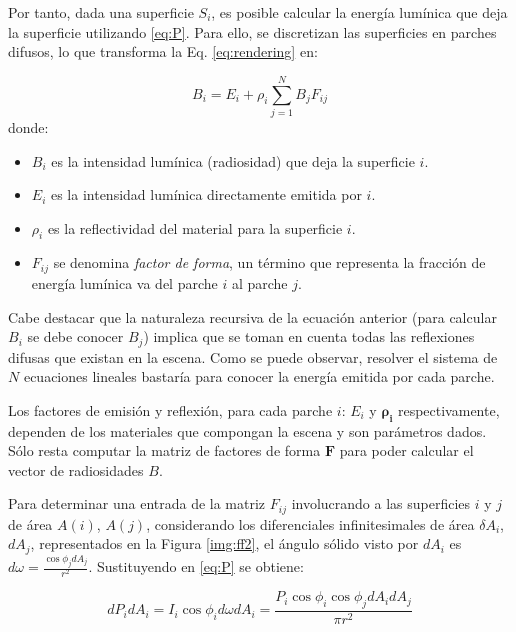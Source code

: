 Por tanto, dada una superficie $S_{i}$, es posible calcular la energía lumínica que deja la superficie utilizando \eqref{eq:P}. Para ello, se discretizan las superficies en parches difusos, lo que transforma la Eq. \eqref{eq:rendering} en:

\begin{equation}
    B_{i} = E_{i} + \rho_{i} \sum_{j=1}^{N} B_{j} F_{ij} \label{eq:radiosity}
\end{equation}
donde:
\begin{itemize}
    \item $B_{i}$ es la intensidad lumínica (radiosidad) que deja la superficie $i$.
    \item $E_{i}$ es la intensidad lumínica directamente emitida por $i$.
    \item $\rho_{i}$ es la reflectividad del material para la superficie $i$.
    \item $F_{ij}$ se denomina \textit{factor de forma}, un término que representa la fracción de energía lumínica va del parche $i$ al parche $j$. 
\end{itemize}

Cabe destacar que la naturaleza recursiva de la ecuación anterior (para calcular $B_{i}$ se debe conocer $B_{j}$) implica que se toman en cuenta todas las reflexiones difusas que existan en la escena. Como se puede observar, resolver el sistema de $N$ ecuaciones lineales bastaría para conocer la energía emitida por cada parche. 

Los factores de emisión y reflexión, para cada parche $i$: $E_{i}$ y $\mathbf{\rho_{i}}$ respectivamente, dependen de los materiales que compongan la escena y son parámetros dados. Sólo resta computar la matriz de factores de forma $\mathbf{F}$ para poder calcular el vector de radiosidades $B$. 

Para determinar una entrada de la matriz $F_{ij}$ involucrando a las superficies $i$ y $j$ de área $A(i)$, $A(j)$, considerando los diferenciales infinitesimales de área $\delta{A_{i}}$, $d{A_{j}}$, representados en la Figura \ref{img:ff2}, el ángulo sólido visto por $d{A_{i}}$ es $d{\omega} = \frac{\cos{\phi_{j}d{A_{j}}}}{r^{2}}$. Sustituyendo en \eqref{eq:P} se obtiene:

\begin{equation}
    d{P}_{i}d{A_{i}} = I_{i} \cos{\phi_{i}}d{\omega}d{A_{i}} = \frac{P_{i}\cos{\phi_{i}}\cos{\phi_{j}}d{A_{i}}d{A_{j}}}{\pi r^{2}}
\end{equation}

